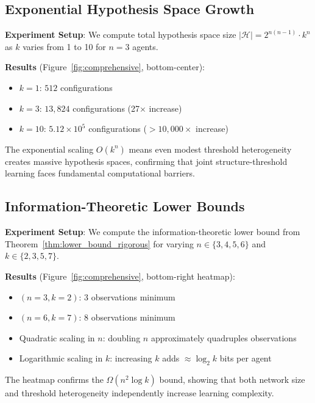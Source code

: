 \documentclass[11pt]{article}
\begin{document}
\subsection{Exponential Hypothesis Space Growth}

\textbf{Experiment Setup}: We compute total hypothesis space size $|\mathcal{H}| = 2^{n(n-1)} \cdot k^n$ as $k$ varies from 1 to 10 for $n=3$ agents.

\textbf{Results} (Figure~\ref{fig:comprehensive}, bottom-center):
\begin{itemize}
\item $k=1$: $512$ configurations
\item $k=3$: $13{,}824$ configurations (27$\times$ increase)
\item $k=10$: $5.12 \times 10^5$ configurations ($>10{,}000\times$ increase)
\end{itemize}

The exponential scaling $O(k^n)$ means even modest threshold heterogeneity creates massive hypothesis spaces, confirming that joint structure-threshold learning faces fundamental computational barriers.

\subsection{Information-Theoretic Lower Bounds}

\textbf{Experiment Setup}: We compute the information-theoretic lower bound from Theorem~\ref{thm:lower_bound_rigorous} for varying $n \in \{3,4,5,6\}$ and $k \in \{2,3,5,7\}$.

\textbf{Results} (Figure~\ref{fig:comprehensive}, bottom-right heatmap):
\begin{itemize}
\item $(n=3, k=2)$: 3 observations minimum
\item $(n=6, k=7)$: 8 observations minimum
\item Quadratic scaling in $n$: doubling $n$ approximately quadruples observations
\item Logarithmic scaling in $k$: increasing $k$ adds $\approx \log_2 k$ bits per agent
\end{itemize}

The heatmap confirms the $\Omega(n^2 \log k)$ bound, showing that both network size and threshold heterogeneity independently increase learning complexity.
\end{document}
